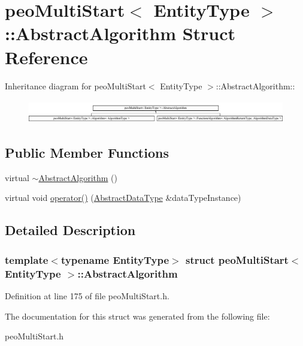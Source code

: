 \hypertarget{structpeoMultiStart_1_1AbstractAlgorithm}{
\section{peo\-Multi\-Start$<$ Entity\-Type $>$::Abstract\-Algorithm Struct Reference}
\label{structpeoMultiStart_1_1AbstractAlgorithm}
}
Inheritance diagram for peo\-Multi\-Start$<$ Entity\-Type $>$::Abstract\-Algorithm::\begin{figure}[H]
\begin{center}
\leavevmode
\includegraphics[height=1.03131cm]{structpeoMultiStart_1_1AbstractAlgorithm}
\end{center}
\end{figure}
\subsection*{Public Member Functions}
\begin{CompactItemize}
\item 
\hypertarget{structpeoMultiStart_1_1AbstractAlgorithm_0371e92bf1c07a89d9fd1534cc74e63e}{
virtual \hyperlink{structpeoMultiStart_1_1AbstractAlgorithm_0371e92bf1c07a89d9fd1534cc74e63e}{$\sim$Abstract\-Algorithm} ()}
\label{structpeoMultiStart_1_1AbstractAlgorithm_0371e92bf1c07a89d9fd1534cc74e63e}

\item 
\hypertarget{structpeoMultiStart_1_1AbstractAlgorithm_3832720a3e6869784fc906c7bda2313c}{
virtual void \hyperlink{structpeoMultiStart_1_1AbstractAlgorithm_3832720a3e6869784fc906c7bda2313c}{operator()} (\hyperlink{structpeoMultiStart_1_1AbstractDataType}{Abstract\-Data\-Type} \&data\-Type\-Instance)}
\label{structpeoMultiStart_1_1AbstractAlgorithm_3832720a3e6869784fc906c7bda2313c}

\end{CompactItemize}


\subsection{Detailed Description}
\subsubsection*{template$<$typename Entity\-Type$>$ struct peo\-Multi\-Start$<$ Entity\-Type $>$::Abstract\-Algorithm}





Definition at line 175 of file peo\-Multi\-Start.h.

The documentation for this struct was generated from the following file:\begin{CompactItemize}
\item 
peo\-Multi\-Start.h\end{CompactItemize}
